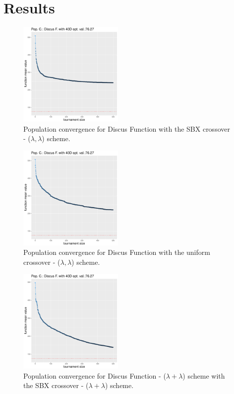 \section{Results}\label{sec:results}

\begin{figure}[t]
	\includegraphics[width=0.45\textwidth]{img/SBX-40D/covergency_unimodal_sbx_11_dim_40.pdf}
	\caption{Population convergence for Discus Function with the SBX crossover - ($\lambda, \lambda$) scheme.}
	\label{convergence-sbx-11-a}
\end{figure}

\begin{figure}[t]
	\includegraphics[width=0.45\textwidth]{img/uniform-40D/covergency_unimodal_uniform_11_dim_40.pdf}
	\caption{Population convergence for Discus Function with the uniform crossover - ($\lambda, \lambda$) scheme.}
	\label{convergence-uniform-11-a}
\end{figure}


\begin{figure}[t]
	\includegraphics[width=0.45\textwidth]{img/2n2n-40D/covergency_unimodal_2n2n_11_dim_40.pdf}
	\caption{Population convergence for Discus Function - ($\lambda + \lambda$) scheme with the SBX crossover - ($\lambda + \lambda$) scheme.}
	\label{convegence-11-b}
\end{figure}


